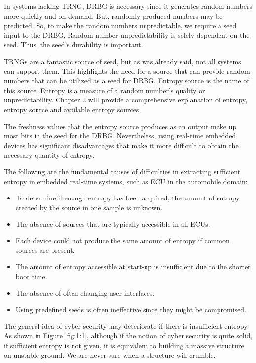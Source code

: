 In systems lacking TRNG, DRBG is necessary since it generates random numbers more quickly and on demand. But, randomly produced numbers may be predicted. So, to make the random numbers unpredictable, we require a seed input to the DRBG. Random number unpredictability is solely dependent on the seed. Thus, the seed's durability is important. 

TRNGs are a fantastic source of seed, but as was already said, not all systems can support them. This highlights the need for a source that can provide random numbers that can be utilized as a seed for DRBG. Entropy source is the name of this source. Entropy is a measure of a random number's quality or unpredictability. Chapter 2 will provide a comprehensive explanation of entropy, entropy source and available entropy sources. 

The freshness values that the entropy source produces as an output make up most bits in the seed for the DRBG. Nevertheless, using real-time embedded devices has significant disadvantages that make it more difficult to obtain the necessary quantity of entropy.

The following are the fundamental causes of difficulties in extracting sufficient entropy in embedded real-time systems, such as ECU in the automobile domain: 

\begin{itemize}
	\item To determine if enough entropy has been acquired, the amount of entropy created by the source in one sample is unknown.
	\item The absence of sources that are typically accessible in all ECUs.
	\item Each device could not produce the same amount of entropy if common sources are present.
	\item The amount of entropy accessible at start-up is insufficient due to the shorter boot time.
	\item The absence of often changing user interfaces.
	\item Using predefined seeds is often ineffective since they might be compromised. 
\end{itemize}

The general idea of cyber security may deteriorate if there is insufficient entropy. As shown in Figure \ref{fig:1:1}, although if the notion of cyber security is quite solid, if sufficient entropy is not given, it is equivalent to building a massive structure on unstable ground. We are never sure when a structure will crumble.

